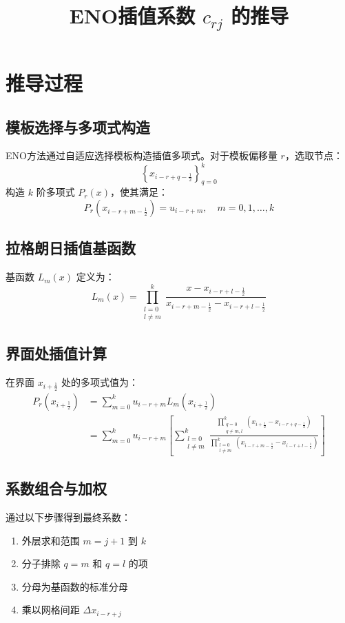 \documentclass{ctexart}
\title{ENO插值系数 $c_{rj}$ 的推导}
\author{}
\date{}
\begin{document}
\maketitle

\section{推导过程}

\subsection{模板选择与多项式构造}
ENO方法通过自适应选择模板构造插值多项式。对于模板偏移量 $r$，选取节点：
\[
\left\{x_{i-r+q-\frac{1}{2}}\right\}_{q=0}^k
\]
构造 $k$ 阶多项式 $P_r(x)$，使其满足：
\begin{equation}
P_r\left(x_{i-r+m-\frac{1}{2}}\right) = u_{i-r+m}, \quad m = 0,1,\dots,k
\end{equation}

\subsection{拉格朗日插值基函数}
基函数 $L_m(x)$ 定义为：
\begin{equation}
L_m(x) = \prod_{\substack{l=0 \\ l \neq m}}^{k} \frac{x - x_{i-r+l-\frac{1}{2}}}{x_{i-r+m-\frac{1}{2}} - x_{i-r+l-\frac{1}{2}}}
\end{equation}

\subsection{界面处插值计算}
在界面 $x_{i+\frac{1}{2}}$ 处的多项式值为：
\begin{align}
P_r\left(x_{i+\frac{1}{2}}\right) &= \sum_{m=0}^{k} u_{i-r+m} L_m\left(x_{i+\frac{1}{2}}\right) \\
&= \sum_{m=0}^{k} u_{i-r+m} \left[ \sum_{\substack{l=0 \\ l \neq m}}^{k} \frac{\prod_{\substack{q=0 \\ q \neq m,l}}^{k} \left(x_{i+\frac{1}{2}} - x_{i-r+q-\frac{1}{2}}\right)}{\prod_{\substack{l=0 \\ l \neq m}}^{k} \left(x_{i-r+m-\frac{1}{2}} - x_{i-r+l-\frac{1}{2}}\right)} \right]
\end{align}

\subsection{系数组合与加权}
通过以下步骤得到最终系数：
\begin{enumerate}
  \item 外层求和范围 $m = j+1$ 到 $k$
  \item 分子排除 $q=m$ 和 $q=l$ 的项
  \item 分母为基函数的标准分母
  \item 乘以网格间距 $\Delta x_{i-r+j}$
\end{enumerate}
\end{document}

